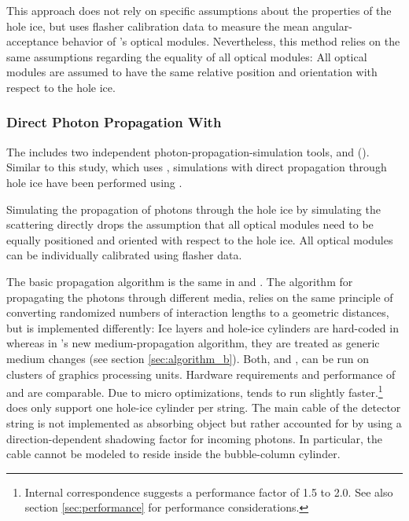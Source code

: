 This approach does not rely on specific assumptions about the properties
of the hole ice, but uses flasher calibration data to measure the mean
angular-acceptance behavior of \icecube's optical modules. Nevertheless,
this method relies on the same assumptions regarding the equality of all
optical modules: All optical modules are assumed to have the same
relative position and orientation with respect to the hole ice.

\subsubsection{Direct Photon Propagation With \ppc}
\label{sec:direct_photon_propagation_with_ppc}

\label{sec:pocam}

The  includes two independent
photon-propagation-simulation tools, \clsim and
\ppc ().
\cite{ppcpaper, ppcsource, ppcforhumans} Similar to this study, which
uses \clsim, simulations with direct propagation through hole ice have
been performed using \ppc.
\cite{martinspicehddard, martindardupdate, pocam, icrc17pocam, ppcpaper}


Simulating the propagation of photons through the hole ice by simulating
the scattering directly drops the assumption that all optical modules
need to be equally positioned and oriented with respect to the hole ice.
All optical modules can be individually calibrated using flasher data.
\cite{martinspicehddard}

The basic propagation algorithm is the same in \ppc and \clsim. The
algorithm for propagating the photons through different media, relies on
the same principle of converting randomized numbers of interaction
lengths to a geometric distances, but is implemented differently: Ice
layers and hole-ice cylinders are hard-coded in \ppc whereas in \clsim's
new medium-propagation algorithm, they are treated as generic medium
changes (see section \ref{sec:algorithm_b}). Both, \ppc and \clsim, can
be run on clusters of graphics processing units.
\cite{ppcpaper, ppcsource, ppcforhumans, clsimsource} Hardware
requirements and performance of \ppc and \clsim are comparable. Due to
micro optimizations, \ppc tends to run slightly
faster.\footnote{Internal correspondence suggests a performance factor of 1.5 to 2.0. See also section \ref{sec:performance} for performance considerations.}
\ppc does only support one hole-ice cylinder per string. The main cable
of the detector string is not implemented as absorbing object but rather
accounted for by using a direction-dependent shadowing factor for
incoming photons. \cite{ppcsource, ppcforhumans} In particular, the
cable cannot be modeled to reside inside the bubble-column cylinder.
\cite{martinspicehddard}

